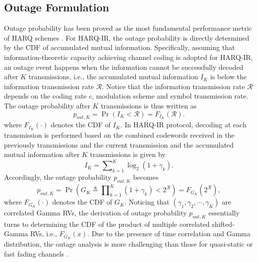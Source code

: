 \documentclass[12pt,onecolumn,draftcls]{IEEEtran}
\newcommand{\bs}{\boldsymbol}
\begin{document}
\subsection{Outage Formulation}
Outage probability has been proved as the most fundamental performance metric of HARQ schemes \cite{caire2001throughput}. For HARQ-IR, the outage probability is directly determined by the CDF of accumulated mutual information. Specifically, assuming that information-theoretic capacity achieving channel coding is adopted for HARQ-IR, an outage event happens when the information cannot be successfully decoded after $K$ transmissions, i.e.,  the accumulated mutual information $I_K$ is below the information transmission rate $\mathcal R$. Notice that the information transmission rate $\mathcal R$ depends on the coding rate $c$, modulation scheme and symbol transmission rate. The outage probability after $K$ transmissions is thus written as
\begin{equation}\label{eqn:out_prob_def}
{p_{out,K}} = \Pr \left( {{I_K}  < \mathcal R} \right) = F_{{I_K}}(\mathcal R).
\end{equation}
where $F_{{I_K}}(\cdot)$ denotes the CDF of ${I_K}$. In HARQ-IR protocol, decoding at each transmission is performed based on the combined codewords received in the previously transmissions and the current transmission and the accumulated mutual information after $K$ transmissions is given by
\begin{equation}\label{eqn:def:accum_inf}
{I_K} = \sum\nolimits_{k = 1}^K {{{\log }_2}\left( {1 + {\gamma _k}} \right)}.
\end{equation}
Accordingly, the outage probability ${p_{out,K}}$ becomes
\begin{equation}\label{eqn:out_prob_rew}
{p_{out,K}} = \Pr \left( {G_K \triangleq \prod\nolimits_{k = 1}^K {\left( {1 + {\gamma _k}} \right)}  < {2^{\mathcal R}}} \right) = {F_{G_K}}\left( {{2^{\mathcal R}}} \right),
\end{equation}
where $F_{G_K}(\cdot)$ denotes the CDF of $G_K$. Noticing that $(\gamma _1,\gamma _2,\cdots,\gamma _K)$ are correlated Gamma RVs, the derivation of outage probability ${p_{out,K}}$ essentially turns to determining the CDF of the product of multiple correlated shifted-Gamma RVs, i.e., ${F_{G_K}}\left( {{x}} \right)$. Due to the presence of time correlation and Gamma distribution, the outage analysis  is more challenging than those for quasi-static \cite{shen2009average,makki2013green} or fast fading channels \cite{to2015power,kim2014optimal,sesia2004incremental,jinho2013energy,stanojev2009energy,aghajanzadeh2011outage,
yilmaz2009productshifted,yilmaz2010outage,chelli2013performance,larsson2014throughput,larsson2016throughput}.  %
\end{document}

